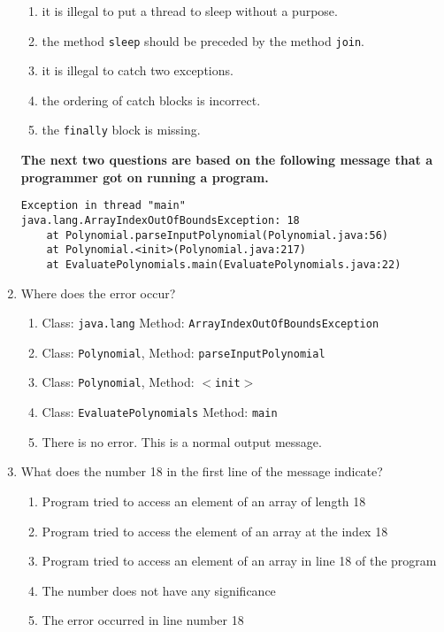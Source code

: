 \documentclass[CS180-S16-FinalExam.tex]{subfiles}
\begin{document}
\begin{enumerate}
\begin{lstlisting}
\end{lstlisting}
\begin{enumerate}
\item it is illegal to put a thread to sleep without a purpose.
\item the method \texttt{sleep} should be preceded by the method \texttt{join}.
\item it is illegal to catch two exceptions.
\item the ordering of catch blocks is incorrect. \ifdraft \Ans \fi 
\item the \texttt{finally} block is missing.
\end{enumerate}

\textbf{The next two questions are based on the following message that a programmer got on running a program.}
\begin{lstlisting}
Exception in thread "main" java.lang.ArrayIndexOutOfBoundsException: 18
	at Polynomial.parseInputPolynomial(Polynomial.java:56)
    at Polynomial.<init>(Polynomial.java:217)
    at EvaluatePolynomials.main(EvaluatePolynomials.java:22)
\end{lstlisting}

\item Where does the error occur?
\begin{enumerate}
\item Class: \texttt{java.lang} Method: \texttt{ArrayIndexOutOfBoundsException}
\item Class: \texttt{Polynomial}, Method: \texttt{parseInputPolynomial} \ifdraft \Ans \fi 
\item Class: \texttt{Polynomial}, Method: \texttt{$<$init$>$}
\item Class: \texttt{EvaluatePolynomials} Method: \texttt{main}
\item There is no error. This is a normal output message.
\end{enumerate}

\item What does the number 18 in the first line of the message indicate?
\begin{enumerate}
\item Program tried to access an element of an array of length 18
\item Program tried to access the element of an array at the index 18 \ifdraft \Ans \fi 
\item Program tried to access an element of an array in line 18 of the program
\item The number does not have any significance
\item The error occurred in line number 18
\end{enumerate}


\end{enumerate}
\end{document}
